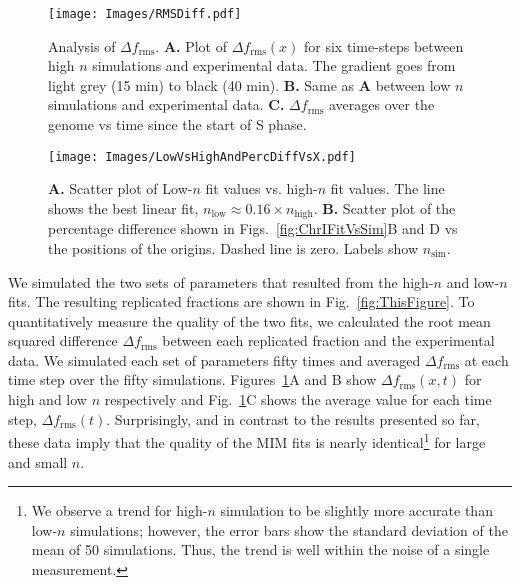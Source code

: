 	\begin{figure}[tbh]
		\begin{center}
			\texttt{[image: Images/RMSDiff.pdf]}
		\end{center}
			\caption[Root Mean Square Difference Between Simulations and Experimental Data]{\label{fig:RMSDiff} 
				Analysis of $\Delta f_\text{rms}$.
				\textbf{A.} Plot of $\Delta f_\text{rms}(x)$ for six time-steps between high $n$ simulations and experimental data.
				The gradient goes from light grey (15 min) to black (40 min).
				\textbf{B.} Same as \textbf{A} between low $n$ simulations and experimental data.
				\textbf{C.} $\Delta f_\text{rms}$ averages over the genome vs time since the start of S phase.
			}
	\end{figure} 
		
	\begin{figure}[tbh!]
		\begin{center}
			\texttt{[image: Images/LowVsHighAndPercDiffVsX.pdf]}
		\end{center}
			\caption[Low-$n$ Fit Values vs. High-$n$ Fit Values and Percentage Difference Over the Genome]{\label{fig:ChrISims}
				\textbf{A.} Scatter plot of Low-$n$ fit values vs. high-$n$ fit values.
				The line shows the best linear fit, $n_\text{low} \approx 0.16\times n_\text{high}$.
				\textbf{B.} Scatter plot of the percentage difference shown in Figs.~\ref{fig:ChrIFitVsSim}B and D vs the positions of the origins.
				Dashed line is zero.
				Labels show $n_\text{sim}$.
			}
	\end{figure} 
	
	We simulated the two sets of parameters that resulted from the high-$n$ and low-$n$ fits.
	The resulting replicated fractions are shown in Fig.~\ref{fig:ThisFigure}.
	To quantitatively measure the quality of the two fits, we calculated the root mean squared difference $\Delta f_\text{rms}$ between each replicated fraction and the experimental data.
	We simulated each set of parameters fifty times and averaged $\Delta f_\text{rms}$ at each time step over the fifty simulations.
	Figures~\ref{fig:RMSDiff}A and B show $\Delta f_\text{rms}(x,t)$ for high and low $n$ respectively and Fig.~\ref{fig:RMSDiff}C shows the average value for each time step, $\Delta f_\text{rms}(t)$.
	Surprisingly, and in contrast to the results presented so far, these data imply that the quality of the MIM fits is nearly identical\footnote{
	We observe a trend for high-$n$ simulation to be slightly more accurate than low-$n$ simulations; however, the error bars show the standard deviation of the mean of 50 simulations. Thus, the trend is well within the noise of a single measurement.}
	for large and small $n$.
		
